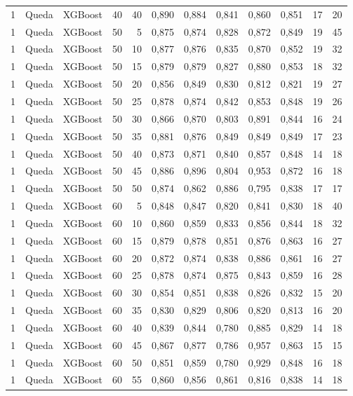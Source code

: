 \begin{longtable}{ccclrrrrrrrr}
1 & Queda & XGBoost & 40 & 40 & 0,890 & 0,884 & 0,841 & 0,860 & 0,851 & 17 & 20 \\
1 & Queda & XGBoost & 50 & 5 & 0,875 & 0,874 & 0,828 & 0,872 & 0,849 & 19 & 45 \\
1 & Queda & XGBoost & 50 & 10 & 0,877 & 0,876 & 0,835 & 0,870 & 0,852 & 19 & 32 \\
1 & Queda & XGBoost & 50 & 15 & 0,879 & 0,879 & 0,827 & 0,880 & 0,853 & 18 & 32 \\
1 & Queda & XGBoost & 50 & 20 & 0,856 & 0,849 & 0,830 & 0,812 & 0,821 & 19 & 27 \\
1 & Queda & XGBoost & 50 & 25 & 0,878 & 0,874 & 0,842 & 0,853 & 0,848 & 19 & 26 \\
1 & Queda & XGBoost & 50 & 30 & 0,866 & 0,870 & 0,803 & 0,891 & 0,844 & 16 & 24 \\
1 & Queda & XGBoost & 50 & 35 & 0,881 & 0,876 & 0,849 & 0,849 & 0,849 & 17 & 23 \\
1 & Queda & XGBoost & 50 & 40 & 0,873 & 0,871 & 0,840 & 0,857 & 0,848 & 14 & 18 \\
1 & Queda & XGBoost & 50 & 45 & 0,886 & 0,896 & 0,804 & 0,953 & 0,872 & 16 & 18 \\
1 & Queda & XGBoost & 50 & 50 & 0,874 & 0,862 & 0,886 & 0,795 & 0,838 & 17 & 17 \\
1 & Queda & XGBoost & 60 & 5 & 0,848 & 0,847 & 0,820 & 0,841 & 0,830 & 18 & 40 \\
1 & Queda & XGBoost & 60 & 10 & 0,860 & 0,859 & 0,833 & 0,856 & 0,844 & 18 & 32 \\
1 & Queda & XGBoost & 60 & 15 & 0,879 & 0,878 & 0,851 & 0,876 & 0,863 & 16 & 27 \\
1 & Queda & XGBoost & 60 & 20 & 0,872 & 0,874 & 0,838 & 0,886 & 0,861 & 16 & 27 \\
1 & Queda & XGBoost & 60 & 25 & 0,878 & 0,874 & 0,875 & 0,843 & 0,859 & 16 & 28 \\
1 & Queda & XGBoost & 60 & 30 & 0,854 & 0,851 & 0,838 & 0,826 & 0,832 & 15 & 20 \\
1 & Queda & XGBoost & 60 & 35 & 0,830 & 0,829 & 0,806 & 0,820 & 0,813 & 16 & 20 \\
1 & Queda & XGBoost & 60 & 40 & 0,839 & 0,844 & 0,780 & 0,885 & 0,829 & 14 & 18 \\
1 & Queda & XGBoost & 60 & 45 & 0,867 & 0,877 & 0,786 & 0,957 & 0,863 & 15 & 15 \\
1 & Queda & XGBoost & 60 & 50 & 0,851 & 0,859 & 0,780 & 0,929 & 0,848 & 16 & 18 \\
1 & Queda & XGBoost & 60 & 55 & 0,860 & 0,856 & 0,861 & 0,816 & 0,838 & 14 & 18 \\

\end{longtable}
